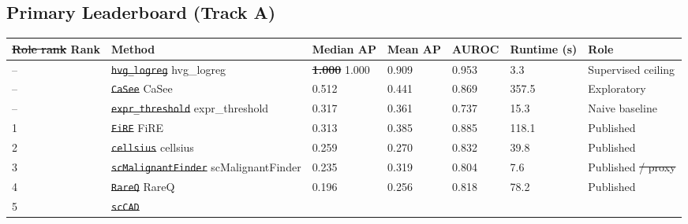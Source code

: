 \documentclass[10pt]{article}
\providecommand{\DIFaddtex}[1]{{\protect\color{trackgreen}#1}} %
\providecommand{\DIFdeltex}[1]{{\protect\color{red}\sout{#1}}}                      %
\providecommand{\DIFaddFL}[1]{\DIFadd{#1}} %
\providecommand{\DIFdelFL}[1]{\DIFdel{#1}} %
\providecommand{\DIFaddbeginFL}{} %
\providecommand{\DIFaddendFL}{} %
\providecommand{\DIFdelbeginFL}{} %
\providecommand{\DIFdelendFL}{} %
\providecommand{\DIFadd}[1]{\texorpdfstring{\DIFaddtex{#1}}{#1}} %
\providecommand{\DIFdel}[1]{\texorpdfstring{\DIFdeltex{#1}}{}} %
\newcommand{\DIFscaledelfig}{0.5}
\newlength{\DIFdelgraphicswidth} %
\newlength{\DIFdelgraphicsheight} %
\newcommand{\DIFaddincludegraphics}[2][]{{\color{trackgreen}\fbox{\DIFOincludegraphics[#1]{#2}}}} %
\newcommand{\DIFdelincludegraphics}[2][]{%
\sbox{\DIFdelgraphicsbox}{\DIFOincludegraphics[#1]{#2}}%
\settoboxwidth{\DIFdelgraphicswidth}{\DIFdelgraphicsbox} %
\settoboxtotalheight{\DIFdelgraphicsheight}{\DIFdelgraphicsbox} %
\scalebox{\DIFscaledelfig}{%
\parbox[b]{\DIFdelgraphicswidth}{\usebox{\DIFdelgraphicsbox}\\[-\baselineskip] \rule{\DIFdelgraphicswidth}{0em}}\llap{\resizebox{\DIFdelgraphicswidth}{\DIFdelgraphicsheight}{%
\setlength{\unitlength}{\DIFdelgraphicswidth}%
\begin{picture}(1,1)%
\thicklines\linethickness{2pt} %
{\color[rgb]{1,0,0}\put(0,0){\framebox(1,1){}}}%
{\color[rgb]{1,0,0}\put(0,0){\line( 1,1){1}}}%
{\color[rgb]{1,0,0}\put(0,1){\line(1,-1){1}}}%
\end{picture}%
}\hspace*{3pt}}} %
} %
\DeclareRobustCommand{\DIFaddbeginFL}{\DIFOaddbeginFL \let\includegraphics\DIFaddincludegraphics} %
\DeclareRobustCommand{\DIFaddendFL}{\DIFOaddendFL \let\includegraphics\DIFOincludegraphics} %
\DeclareRobustCommand{\DIFdelbeginFL}{\DIFOdelbeginFL \let\includegraphics\DIFdelincludegraphics} %
\DeclareRobustCommand{\DIFdelendFL}{\DIFOaddendFL \let\includegraphics\DIFOincludegraphics} %
\begin{document}
\begin{center}\DIFaddFL{\rule{0.5\linewidth}{0.5pt}}\end{center}

\subsection{\DIFaddFL{Primary Leaderboard (Track
A)}}\label{primary-leaderboard-track-a}

\begin{longtable}[]{@{}lllllll@{}}
\DIFaddendFL \toprule\DIFdelbeginFL \DIFdelFL{Role rank }\DIFdelendFL \DIFaddbeginFL \noalign{}
\DIFaddFL{Rank }\DIFaddendFL & Method & Median AP & Mean AP & AUROC & Runtime (s) & Role \\
\midrule\DIFaddbeginFL \noalign{}
\endhead
\bottomrule\noalign{}
\endlastfoot
\DIFaddendFL -- & \DIFdelbeginFL \texttt{\DIFdelFL{hvg\_logreg}}        %
\DIFdelendFL \DIFaddbeginFL \DIFaddFL{hvg\_logreg }\DIFaddendFL & \DIFdelbeginFL \textbf{\DIFdelFL{1.000}} %
\DIFdelendFL \DIFaddbeginFL \DIFaddFL{1.000 }\DIFaddendFL & 0.909 & 0.953 & 3.3 & Supervised ceiling \\
-- & \DIFdelbeginFL \texttt{\DIFdelFL{CaSee}}              %
\DIFdelendFL \DIFaddbeginFL \DIFaddFL{CaSee }\DIFaddendFL & 0.512 & 0.441 & 0.869 & 357.5 & Exploratory \\
-- & \DIFdelbeginFL \texttt{\DIFdelFL{expr\_threshold}}    %
\DIFdelendFL \DIFaddbeginFL \DIFaddFL{expr\_threshold }\DIFaddendFL & 0.317 & 0.361 & 0.737 & 15.3 & Naive baseline \\
1 & \DIFdelbeginFL \texttt{\DIFdelFL{FiRE}}               %
\DIFdelendFL \DIFaddbeginFL \DIFaddFL{FiRE }\DIFaddendFL & 0.313 & 0.385 & 0.885 & 118.1 & Published \\
2 & \DIFdelbeginFL \texttt{\DIFdelFL{cellsius}}           %
\DIFdelendFL \DIFaddbeginFL \DIFaddFL{cellsius }\DIFaddendFL & 0.259 & 0.270 & 0.832 & 39.8 & Published \\
3 & \DIFdelbeginFL \texttt{\DIFdelFL{scMalignantFinder}}  %
\DIFdelendFL \DIFaddbeginFL \DIFaddFL{scMalignantFinder }\DIFaddendFL & 0.235 & 0.319 & 0.804 & 7.6 & Published \DIFdelbeginFL \DIFdelFL{/ proxy }\DIFdelendFL \\
4 & \DIFdelbeginFL \texttt{\DIFdelFL{RareQ}}              %
\DIFdelendFL \DIFaddbeginFL \DIFaddFL{RareQ }\DIFaddendFL & 0.196 & 0.256 & 0.818 & 78.2 & Published \\
5 & \DIFdelbeginFL \texttt{\DIFdelFL{scCAD}}              %

\end{longtable}
\end{document}
